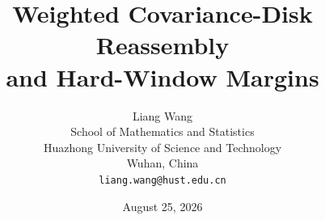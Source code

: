\documentclass[11pt]{article}
\title{Weighted Covariance-Disk Reassembly\\
and Hard-Window Margins}
\author{Liang Wang\\
School of Mathematics and Statistics\\
Huazhong University of Science and Technology\\
Wuhan, China\\
\texttt{liang.wang@hust.edu.cn}}
\date{August 25, 2026}
\theoremstyle{remark}
\begin{document}
\maketitle

\begin{abstract}

\end{abstract}










\appendix

\end{document}
